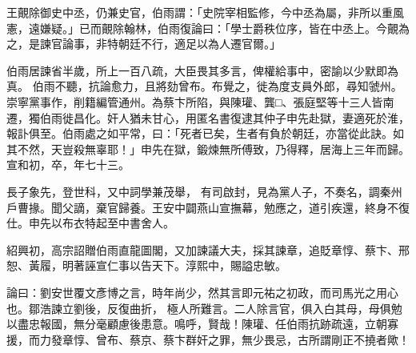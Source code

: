 \begin{pinyinscope}
 王覿除御史中丞，仍兼史官，伯雨謂：「史院宰相監修，今中丞為屬，非所以重風憲，遠嫌疑。」已而覿除翰林，伯雨復論曰：「學士爵秩位序，皆在中丞上。今覿為之，是諫官論事，非特朝廷不行，適足以為人遷官爾。」



 伯雨居諫省半歲，所上一百八疏，大臣畏其多言，俾權給事中，密諭以少默即為真。
 伯雨不聽，抗論愈力，且將劾曾布。布覺之，徙為度支員外郎，尋知虢州。崇寧黨事作，削籍編管通州。為蔡卞所陷，與陳瓘、龔□、張庭堅等十三人皆南遷，獨伯雨徙昌化。奸人猶未甘心，用匿名書復逮其仲子申先赴獄，妻適死於淮，報訃俱至。伯雨處之如平常，曰：「死者已矣，生者有負於朝廷，亦當從此訣。如其不然，天豈殺無辜耶！」申先在獄，鍛煉無所傅致，乃得釋，居海上三年而歸。宣和初，卒，年七十三。



 長子象先，登世科，又中詞學兼茂舉，
 有司啟封，見為黨人子，不奏名，調秦州戶曹掾。聞父謫，棄官歸養。王安中闢燕山宣撫幕，勉應之，道引疾還，終身不復仕。申先以布衣特起至中書舍人。



 紹興初，高宗詔贈伯雨直龍圖閣，又加諫議大夫，採其諫章，追貶章惇、蔡卞、邢恕、黃履，明著誣宣仁事以告天下。淳熙中，賜謚忠敏。



 論曰：劉安世覆文彥博之言，時年尚少，然其言即元祐之初政，而司馬光之用心也。鄒浩諫立劉後，反復曲折，
 極人所難言。二人除言官，俱入白其母，母俱勉以盡忠報國，無分毫顧慮後患意。鳴呼，賢哉！陳瓘、任伯雨抗跡疏遠，立朝寡援，而力發章惇、曾布、蔡京、蔡卞群奸之罪，無少畏忌，古所謂剛正不撓者歟！



\end{pinyinscope}